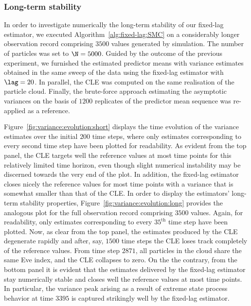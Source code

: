 \subsubsection{Long-term stability}
\label{sec:long:term:stability}

In order to investigate numerically the long-term stability of our fixed-lag estimator, we executed Algorithm~\ref{alg:fixed-lag:SMC} on a considerably longer observation record comprising $3500$ values generated by simulation. The number of particles was set to $\N = 5000$. Guided by the outcome of the previous experiment, we furnished the estimated predictor means with variance estimates obtained in the same sweep of the data using the fixed-lag estimator with $\lag = 20$. In parallel, the CLE was computed on the same realisation of the particle cloud. Finally, the brute-force approach estimating the asymptotic variances on the basis of $1200$ replicates of the predictor mean sequence was re-applied as a reference. 

Figure~\ref{fig:variance:evolution:short} displays the time evolution of the variance estimates over the initial $200$ time steps, where only estimates corresponding to every second time step have been plotted for readability. As evident from the top panel, the CLE targets well the reference values at most time points for this relatively limited time horizon, even though slight numerical instability may be discerned towards the very end of the plot. In addition, the fixed-lag estimator closes nicely the reference values for most time points with a variance that is somewhat smaller than that of the CLE. In order to display the estimators' long-term stability properties, Figure~\ref{fig:variance:evolution:long} provides the analogous plot for the full observation record comprising $3500$ values. Again, for readability, only estimates corresponding to every $35^\mathrm{th}$ time step have been plotted. Now, as clear from the top panel, the estimates produced by the CLE degenerate rapidly and after, say, $1500$ time steps the CLE loses track completely of the reference values. From time step $2871$, all particles in the cloud share the same Eve index, and the CLE collapses to zero. On the the contrary, from the bottom panel it is evident that the estimates delivered by the fixed-lag estimator stay numerically stable and closes well the reference values at most time points. In particular, the variance peak arising as a result of extreme state process behavior at time $3395$ is captured strikingly well by the fixed-lag estimator. 

